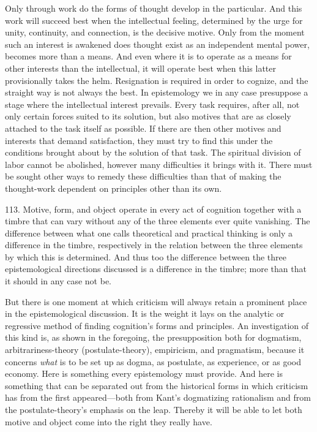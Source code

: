 \documentclass[12pt,a4paper]{book}
\newcommand{\opage}[1]{\marginnote{\footnotesize\textit{[#1]}}}
\begin{document}
Only through work do the forms of thought develop in the particular. And this
work will succeed best when the intellectual feeling, determined by the urge for
unity, continuity, and connection, is the decisive motive. Only from the moment
such an interest is awakened does thought exist as an independent mental power,
becomes more than a means. And even where it is to operate as a means for other
interests than the intellectual, it will operate best when this latter
provisionally takes the helm. Resignation is required in order to cognize, and
the straight way is not always the best. In epistemology we in any case
presuppose a stage where the intellectual interest prevails. Every task
requires, after all, not only certain forces suited to its solution, but also
motives that are as closely attached to the task itself as possible. If there
are then other motives and interests that demand satisfaction, they must try to
find this under the conditions brought about by the solution of that task. The
spiritual division of labor cannot be abolished, however many difficulties it
brings with it. There must be sought other ways to remedy these difficulties
than that of making the thought-work dependent on principles other than its own.

113. Motive, form, and object operate in every act of cognition together with a
timbre that can vary without any of the three elements ever quite vanishing.
The difference between what one calls theoretical and practical thinking is only
a difference in the timbre, respectively in the relation between the three
elements by which this is determined. And thus too the difference between the
three \opage{273}epistemological directions discussed is a difference in the timbre; more
than that it should in any case not be.

But there is one moment at which criticism will always retain a prominent place
in the epistemological discussion. It is the weight it lays on the analytic or
regressive method of finding cognition's forms and principles. An investigation
of this kind is, as shown in the foregoing, the presupposition both for
dogmatism, arbitrariness-theory (postulate-theory), empiricism, and pragmatism,
because it concerns \emph{what} is to be set up as dogma, as postulate, as
experience, or as good economy. Here is something every epistemology must
provide. And here is something that can be separated out from the historical
forms in which criticism has from the first appeared---both from Kant's
dogmatizing rationalism and from the postulate-theory's emphasis on the leap.
Thereby it will be able to let both motive and object come into the right they
really have.
\end{document}
